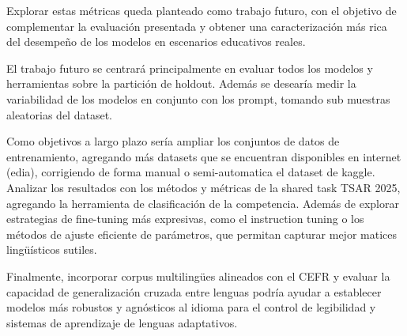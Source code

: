 Explorar estas métricas queda planteado como trabajo futuro, con el objetivo de complementar la evaluación presentada y obtener una caracterización más rica del desempeño de los modelos en escenarios educativos reales.

El trabajo futuro se centrará principalmente en evaluar todos los modelos y herramientas sobre la partición de holdout. Además se desearía medir la variabilidad de los modelos en conjunto con los prompt, tomando sub muestras aleatorias del dataset.

Como objetivos a largo plazo sería ampliar los conjuntos de datos de entrenamiento, agregando más datasets que se encuentran disponibles en internet (edia), corrigiendo de forma manual o semi-automatica el dataset de kaggle. Analizar los resultados con los métodos y métricas de la shared task TSAR 2025, agregando la herramienta de clasificación de la competencia. Además de explorar estrategias de fine-tuning más expresivas, como el instruction tuning o los métodos de ajuste eficiente de parámetros, que permitan capturar mejor matices lingüísticos sutiles. 

Finalmente, incorporar corpus multilingües alineados con el CEFR y evaluar la capacidad de generalización cruzada entre lenguas podría ayudar a establecer modelos más robustos y agnósticos al idioma para el control de legibilidad y sistemas de aprendizaje de lenguas adaptativos.
